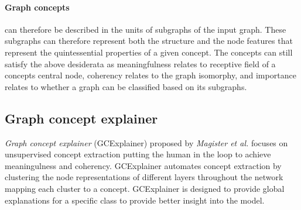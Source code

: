 

\paragraph{Graph concepts} can therefore be described in the units of subgraphs of the input graph.
These subgraphs can therefore represent both the structure and the node features that represent the quintessential properties of a given concept.
The concepts can still satisfy the above desiderata as meaningfulness relates to receptive field of a concepts central node, coherency relates to the graph isomorphy, and importance relates to whether a graph can be classified based on its subgraphs.



\subsection{Graph concept explainer}
\label{sec:GCE}



\emph{Graph concept explainer} (GCExplainer) proposed by \textit{Magister et al.}\cite{magister2021gcexplainer} focuses on unsupervised concept extraction putting the human in the loop to achieve meaningulness and coherency.
GCExplainer automates concept extraction by clustering the node representations of different layers throughout the network mapping each cluster to a concept.
GCExplainer is designed to provide global explanations for a specific class to provide better insight into the model.



